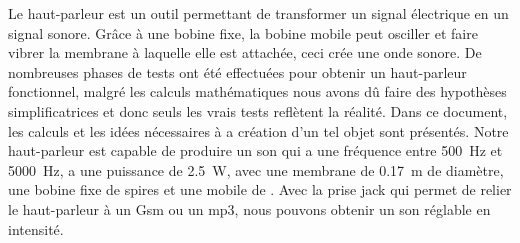 

\begin{abstract-fr}
Le haut-parleur est un outil permettant de transformer un signal électrique en un signal sonore.  Grâce à une bobine fixe, la bobine mobile peut osciller et faire vibrer la membrane à laquelle elle est attachée, ceci crée une onde sonore.
De nombreuses phases de tests ont été effectuées pour obtenir un haut-parleur fonctionnel, malgré les calculs mathématiques nous avons dû faire des hypothèses simplificatrices et donc seuls les vrais tests reflètent la réalité.
Dans ce document, les calculs et les idées nécessaires à a création d’un tel objet sont présentés.  
Notre haut-parleur est capable de produire un son qui a une fréquence entre \SI{500}{\hertz} et \SI{5000}{\hertz}, a une puissance de \SI{2.5}{\watt}, avec une membrane de \SI{0.17}{\meter} de diamètre, une bobine fixe de  spires et une mobile de . Avec la prise jack qui permet de relier le haut-parleur à un Gsm ou un mp3, nous pouvons obtenir un son réglable en intensité.
\end{abstract-fr}


